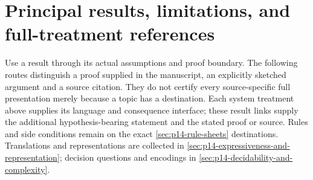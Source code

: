 \section{Principal results, limitations, and full-treatment references}
\label{sec:p14-directory-results}

Use a result through its actual assumptions and proof boundary. The following
routes distinguish a proof supplied in the manuscript, an explicitly
sketched argument and a source citation. They do not certify every
source-specific full presentation merely because a topic has a destination.
Each system treatment above supplies its language and consequence interface;
these result links supply the additional hypothesis-bearing statement and
the stated proof or source. Rules and side conditions remain on the exact
\cref{sec:p14-rule-sheets} destinations. Translations and representations
are collected in \cref{sec:p14-expressiveness-and-representation}; decision
questions and encodings in \cref{sec:p14-decidability-and-complexity}.

